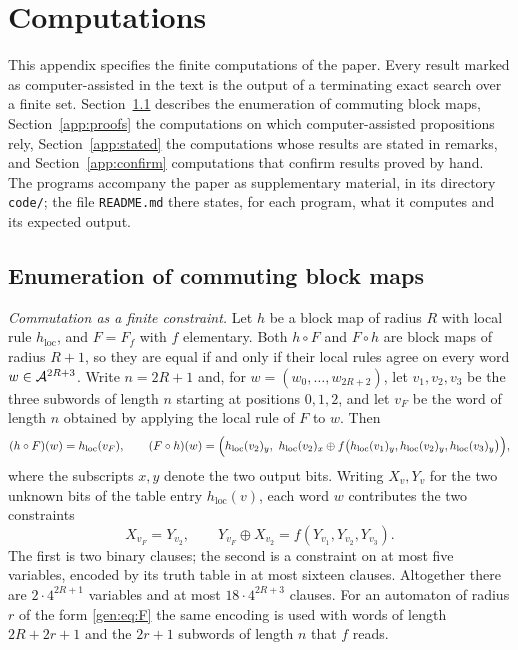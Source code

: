 \section{Computations}\label{app:comp}

This appendix specifies the finite computations of the paper. Every result marked as computer-assisted in the text is the output of a terminating exact search over a finite set. Section~\ref{app:method} describes the enumeration of commuting block maps, Section~\ref{app:proofs} the computations on which computer-assisted propositions rely, Section~\ref{app:stated} the computations whose results are stated in remarks, and Section~\ref{app:confirm} computations that confirm results proved by hand. The programs accompany the paper as supplementary material, in its directory \texttt{code/}; the file \texttt{README.md} there states, for each program, what it computes and its expected output.

\subsection{Enumeration of commuting block maps}\label{app:method}

\emph{Commutation as a finite constraint.} Let $h$ be a block map of radius $R$ with local rule $h_{\mathrm{loc}}$, and $F=F_f$ with $f$ elementary. Both $h\circ F$ and $F\circ h$ are block maps of radius $R+1$, so they are equal if and only if their local rules agree on every word $w\in\mathcal{A}^{2R+3}$. Write $n=2R+1$ and, for $w=(w_0,\dots,w_{2R+2})$, let $v_1,v_2,v_3$ be the three subwords of length $n$ starting at positions $0,1,2$, and let $v_F$ be the word of length $n$ obtained by applying the local rule of $F$ to $w$. Then
\[
(h\circ F)(w)=h_{\mathrm{loc}}(v_F),\qquad (F\circ h)(w)=\Bigl(h_{\mathrm{loc}}(v_2)_y,\ h_{\mathrm{loc}}(v_2)_x\oplus f\bigl(h_{\mathrm{loc}}(v_1)_y,h_{\mathrm{loc}}(v_2)_y,h_{\mathrm{loc}}(v_3)_y\bigr)\Bigr),
\]
where the subscripts $x,y$ denote the two output bits. Writing $X_v,Y_v$ for the two unknown bits of the table entry $h_{\mathrm{loc}}(v)$, each word $w$ contributes the two constraints
\begin{equation}\label{app:eq:constraints}
X_{v_F}=Y_{v_2},\qquad Y_{v_F}\oplus X_{v_2}=f(Y_{v_1},Y_{v_2},Y_{v_3}).
\end{equation}
The first is two binary clauses; the second is a constraint on at most five variables, encoded by its truth table in at most sixteen clauses. Altogether there are $2\cdot4^{2R+1}$ variables and at most $18\cdot4^{2R+3}$ clauses. For an automaton of radius $r$ of the form \eqref{gen:eq:F} the same encoding is used with words of length $2R+2r+1$ and the $2r+1$ subwords of length $n$ that $f$ reads.

